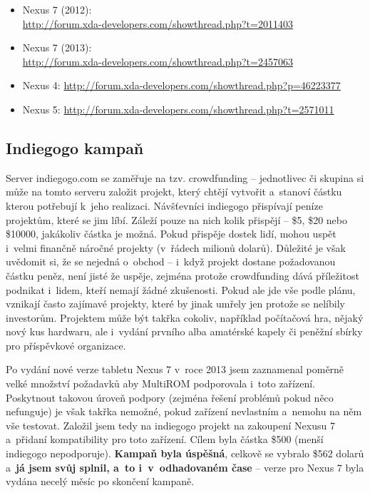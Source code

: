 \documentclass[12pt, a4paper, oneside]{article}
\newcommand{\B}{\textbf} %
\begin{document}
\begin{itemize}
\item Nexus 7 (2012):\\ \url{http://forum.xda-developers.com/showthread.php?t=2011403}
\item Nexus 7 (2013):\\ \url{http://forum.xda-developers.com/showthread.php?t=2457063}
\item Nexus 4: \url{http://forum.xda-developers.com/showthread.php?p=46223377}
\item Nexus 5: \url{http://forum.xda-developers.com/showthread.php?t=2571011}
\end{itemize}

\subsection{Indiegogo kampaň}
Server indiegogo.com\cite{indiegogo} se zaměřuje na tzv. crowdfunding -- jednotlivec či skupina si může na tomto serveru založit projekt, který chtějí vytvořit a~stanoví částku kterou potřebují k~jeho realizaci. Návšťevníci indiegogo přispívají peníze projektům, které se jim líbí. Záleží pouze na nich kolik přispějí -- \$5, \$20 nebo \$10000, jakákoliv částka je možná. Pokud přispěje dostek lidí, mohou uspět i~velmi finančně náročné projekty (v~řádech milionů dolarů). Důležité je však uvědomit si, že se nejedná o~obchod -- i~když projekt dostane požadovanou částku peněz, není jisté že uspěje, zejména protože crowdfunding dává příležitost podnikat i~lidem, kteří nemají žádné zkušenosti. Pokud ale jde vše podle plánu, vznikají často zajímavé projekty, které by jinak umřely jen protože se nelíbily investorům. Projektem může být takřka cokoliv, například počítačová hra, nějaký nový kus hardwaru, ale i~vydání prvního alba amatérské kapely či peněžní sbírky pro příspěvkové organizace.

Po vydání nové verze tabletu Nexus 7 v~roce 2013 jsem zaznamenal poměrně velké množství požadavků aby MultiROM podporovala i~toto zařízení. Poskytnout takovou úroveň podpory (zejména řešení problémů pokud něco nefunguje) je však takřka nemožné, pokud zařízení nevlastním a~nemohu na něm vše testovat. Založil jsem tedy na indiegogo projekt na zakoupení Nexusu 7 a~přidaní kompatibility pro toto zařízení\cite{indiegogo-multirom}. Cílem byla částka \$500 (menší indiegogo nepodporuje). \B{Kampaň byla úspěšná}, celkově se vybralo \$562 dolarů a~\B{já jsem svůj  splnil, a~to i~v~odhadovaném čase} -- verze pro Nexus 7 byla vydána necelý měsíc po skončení kampaně.
\end{document}
